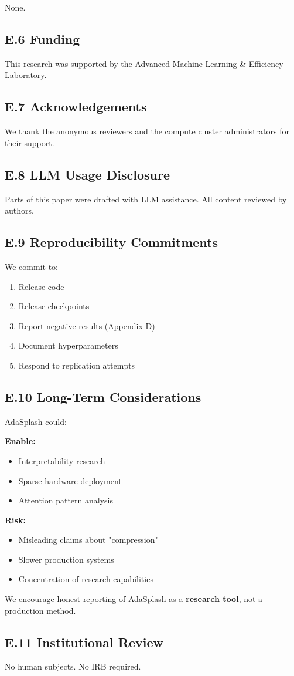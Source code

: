 None.

\subsection{E.6 Funding}

This research was supported by the Advanced Machine Learning & Efficiency Laboratory.

\subsection{E.7 Acknowledgements}

We thank the anonymous reviewers and the compute cluster administrators for their support.

\subsection{E.8 LLM Usage Disclosure}

Parts of this paper were drafted with LLM assistance. All content reviewed 
by authors.

\subsection{E.9 Reproducibility Commitments}

We commit to:
\begin{enumerate}
\item Release code
\item Release checkpoints
\item Report negative results (Appendix D)
\item Document hyperparameters
\item Respond to replication attempts

\end{enumerate}
\subsection{E.10 Long-Term Considerations}

AdaSplash could:

\textbf{Enable:}
\begin{itemize}
\item Interpretability research
\item Sparse hardware deployment
\item Attention pattern analysis

\end{itemize}
\textbf{Risk:}
\begin{itemize}
\item Misleading claims about "compression"
\item Slower production systems
\item Concentration of research capabilities

\end{itemize}
We encourage honest reporting of AdaSplash as a \textbf{research tool}, not a 
production method.

\subsection{E.11 Institutional Review}

No human subjects. No IRB required.